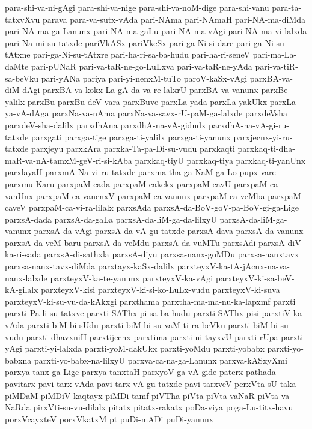 {para-shi-va-ni-gAgi
para-shi-va-nige
para-shi-va-noM-dige
para-shi-vanu
para-ta-tatxvXvu
parava
para-va-sutx-vAda
pari-NAma
pari-NAmaH
pari-NA-ma-diMda
pari-NA-ma-ga-Lanunx
pari-NA-ma-gaLu
pari-NA-ma-vAgi
pari-NA-ma-vi-lalxda
pari-Na-mi-su-tatxde
pariVkASx
pariVkeSx
pari-ga-Ni-si-dare
pari-ga-Ni-su-tAtxne
pari-ga-Ni-su-tAtxre
pari-ha-ri-sa-ba-hudu
pari-ha-ri-seneV
pari-ma-La-daMte
pari-pUNaR
pari-va-taR-ne-go-LuLxva
pari-va-taR-ne-yAda
pari-va-tiR-sa-beVku
pari-yANa
pariya
pari-yi-nenxM-tuTo
paroV-kaSx-vAgi
parxBA-va-diM-dAgi
parxBA-va-kokx-La-gA-da-va-re-lalxrU
parxBA-va-vanunx
parxBe-yalilx
parxBu
parxBu-deV-vara
parxBuve
parxLa-yada
parxLa-yakUkx
parxLa-ya-vA-dAga
parxNa-va-nAma
parxNa-va-savx-rU-paM-ga-lalxde
parxdeVsha
parxdeV-sha-dalilx
parxdhAna
parxdhA-na-vA-gidudx
parxdhA-na-vA-gi-ru-tatxde
parxgati
parxga-tige
parxga-ti-yalilx
parxga-ti-yanunx
parxjecnx-yi-ru-tatxde
parxjeyu
parxkAra
parxka-Ta-pa-Di-su-vudu
parxkaqti
parxkaq-ti-dha-maR-va-nA-tamxM-geV-ri-si-kAba
parxkaq-tiyU
parxkaq-tiya
parxkaq-ti-yanUnx
parxlayaH
parxmA-Na-vi-ru-tatxde
parxma-tha-ga-NaM-ga-Lo-pupx-vare
parxmu-Karu
parxpaM-cada
parxpaM-cakekx
parxpaM-cavU
parxpaM-ca-vanUnx
parxpaM-ca-vanenxV
parxpaM-ca-vanunx
parxpaM-ca-veMba
parxpaM-caveV
parxpaM-ca-vi-ra-lilalx
parxsAda
parxsA-da-BoV-goV-pa-BoV-gi-ga-Lige
parxsA-dada
parxsA-da-gaLa
parxsA-da-liM-ga-da-lilxyU
parxsA-da-liM-ga-vanunx
parxsA-da-vAgi
parxsA-da-vA-gu-tatxde
parxsA-dava
parxsA-da-vanunx
parxsA-da-veM-baru
parxsA-da-veMdu
parxsA-da-vuMTu
parxsAdi
parxsA-diV-ka-ri-sada
parxsA-di-sathxla
parxsA-diyu
parxsa-nanx-goMDu
parxsa-nanxtavx
parxsa-nanx-tavx-diMda
parxtayx-kaSx-dalilx
parxteyxV-ka-tA-jAcnx-na-va-nanx-lalxde
parxteyxV-ka-te-yanunx
parxteyxV-ka-vAgi
parxteyxV-ki-sa-beV-kA-gilalx
parxteyxV-kisi
parxteyxV-ki-si-ko-LuLx-vudu
parxteyxV-ki-suva
parxteyxV-ki-su-vu-da-kAkxgi
parxthama
parxtha-ma-ma-nu-ka-lapxmf
parxti
parxti-Pa-li-su-tatxve
parxti-SAThx-pi-sa-ba-hudu
parxti-SAThx-pisi
parxtiV-ka-vAda
parxti-biM-bi-sUdu
parxti-biM-bi-su-vaM-ti-ra-beVku
parxti-biM-bi-su-vudu
parxti-dhavxniH
parxtijecnx
parxtima
parxti-ni-tayxvU
parxti-rUpa
parxti-yAgi
parxti-yi-lalxda
parxti-yoM-dakUkx
parxti-yoMdu
parxti-yobabx
parxti-yo-babxna
parxti-yo-babx-na-lilxyU
parxva-ca-na-ga-Lanunx
parxva-kASxyXmi
parxya-tanx-ga-Lige
parxya-tanxtaH
parxyoV-ga-vA-gide
paterx
pathada
pavitarx
pavi-tarx-vAda
pavi-tarx-vA-gu-tatxde
pavi-tarxveV
perxVta-sU-taka
piMDaM
piMDiV-kaqtayx
piMDi-tamf
piVTha
piVta
piVta-vaNaR
piVta-va-NaRda
pirxVti-su-vu-dilalx
pitatx
pitatx-rakatx
poDa-viya
poga-Lu-titx-havu
porxVcayxteV
porxVkatxM
pt
puDi-mADi
puDi-yanunx
}
